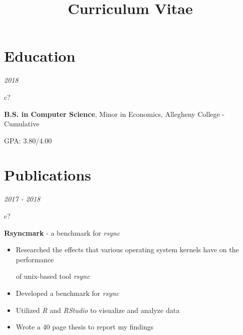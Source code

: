 \documentclass[12pt,a4paper,sans]{moderncv} %
\title{Curriculum Vitae}
\begin{document}
\begin{comment}
\hspace{2 mm}
\textit{2018}
\hspace{2 mm}
\begin{tabular}{c?}
 \\
\end{tabular}
 \hspace{2 mm}
 \textbf{B.S. in Computer Science}, minor in Economics, Allegheny College - cumulative GPA: 3.80
\end{comment}

\makecvtitle %
\vspace{-13 mm}
\section{Education}
\hspace{11 mm}
\textit{2018}
\hspace{2 mm}
\begin{tabular}{c?}
 \\
\end{tabular}
 \hspace{2 mm}
 \textbf{B.S. in Computer Science}, Minor in Economics, Allegheny College - Cumulative 
 
 \hspace{31.5 mm}GPA: 3.80/4.00
 
\vspace{-4 mm}
\section{Publications}

\textit{2017 - 2018}
\hspace{2 mm}
\begin{tabular}{c?}
 \\
\end{tabular}
 \hspace{2 mm} \textbf{Rsyncmark} - a benchmark for \textit{rsync} 
 
 \begin{itemize}
 \addtolength{\itemindent}{31.7 mm} 
  \item Researched the effects that various operating system kernels have on the performance 
 
  \hspace{30.5 mm} of  unix-based tool \textit{rsync}
 \item{Developed a benchmark for \textit{rsync}}
 \item{Utilized \textit{R} and \textit{RStudio} to visualize and analyze data}
 \item{Wrote a 40 page thesis to report my findings }
 \end{itemize}
 
\end{document}
